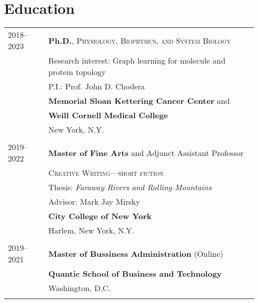 \documentclass[letterpaper,10pt]{article}
\begin{document}
\section{Education}
\begin{longtable}{p{} p{} }

\textsc{2018--2023} & \textbf{Ph.D.}, \textsc{Physiology, Biophysics, and System Biology}\\
                 & Research interest: Graph learning for molecule and protein topology\\
                 & P.I.: Prof. John D. Chodera\\
                 & \textbf{Memorial Sloan Kettering Cancer Center} and \\
                 & \textbf{Weill Cornell Medical College}\\
                 & New York, N.Y.\\\\
                 
\textsc{2019--2022} & \textbf{Master of Fine Arts} and Adjunct Assistant Professor \\
                 & \textsc{Creative Writing---short fiction} \\
                 & Thesis: \textit{Faraway Rivers and Rolling Mountains} \\
                 & Advisor: Mark Jay Mirsky \\
                 & \textbf{City College of New York} \\
                 & Harlem, New York, N.Y.\\\\
                 
\textsc{2019--2021} & \textbf{Master of Bussiness Administration} (Online)\\
                 & \textbf{Quantic School of Business and Technology} \\
                 & Washington, D.C.\\\\
                 


\end{longtable}
\end{document}

